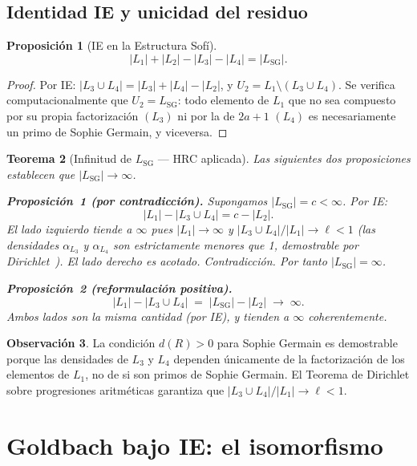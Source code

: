 \documentclass[11pt,a4paper]{article}
\newtheorem{theorem}{Teorema}
\newtheorem{proposition}[theorem]{Proposición}
\theoremstyle{definition}
\newtheorem{remark}[theorem]{Observación}
\begin{document}
\subsection{Identidad IE y unicidad del residuo}

\begin{proposition}[IE en la Estructura Sofí]\label{prop:sofi-ie}
\[
    |L_1| + |L_2| - |L_3| - |L_4| = |L_{\mathrm{SG}}|.
\]
\end{proposition}
\begin{proof}
Por IE: $|L_3\cup L_4|=|L_3|+|L_4|-|L_2|$, y
$U_2=L_1\setminus(L_3\cup L_4)$.  Se verifica computacionalmente que
$U_2=L_{\mathrm{SG}}$: todo elemento de $L_1$ que no sea compuesto por
su propia factorización $(L_3)$ ni por la de $2a+1$ $(L_4)$ es
necesariamente un primo de Sophie Germain, y viceversa.
\end{proof}

\begin{theorem}[Infinitud de $L_{\mathrm{SG}}$ --- HRC aplicada]\label{thm:lsg}
Las siguientes dos proposiciones establecen que $|L_{\mathrm{SG}}|\to\infty$.

\medskip\noindent
\textbf{Proposición~1 (por contradicción).}
Supongamos $|L_{\mathrm{SG}}|=c<\infty$.  Por IE:
\[
    |L_1| - |L_3\cup L_4| = c - |L_2|.
\]
El lado izquierdo tiende a $\infty$ pues $|L_1|\to\infty$ y
$|L_3\cup L_4|/|L_1|\to\ell<1$ (las densidades $\alpha_{L_3}$ y
$\alpha_{L_4}$ son estrictamente menores que 1, demostrable por
Dirichlet~\cite{dirichlet1837}).
El lado derecho es acotado.  Contradicción.  Por tanto $|L_{\mathrm{SG}}|=\infty$.

\medskip\noindent
\textbf{Proposición~2 (reformulación positiva).}
\[
    |L_1| - |L_3\cup L_4| \;=\; |L_{\mathrm{SG}}| - |L_2|
    \;\to\;\infty.
\]
Ambos lados son la misma cantidad (por IE), y tienden a $\infty$
coherentemente.
\end{theorem}

\begin{remark}
La condición $d(R)>0$ para Sophie Germain es demostrable porque las
densidades de $L_3$ y $L_4$ dependen únicamente de la factorización de
los elementos de $L_1$, no de si son primos de Sophie Germain.
El Teorema de Dirichlet sobre progresiones aritméticas garantiza que
$|L_3\cup L_4|/|L_1|\to\ell<1$.
\end{remark}

\section{Goldbach bajo IE: el isomorfismo}
\end{document}
